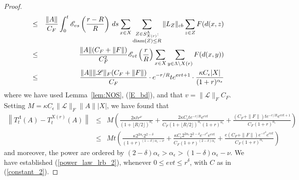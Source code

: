 \documentclass{article}
\newcommand{\E}{\mathscr{E}}
\newcommand{\<}{\langle}
\renewcommand{\>}{\rangle}
\numberwithin{equation}{section}
\theoremstyle{definition}
\begin{document}
\begin{proof}
\begin{eqnarray}
& \leq &
\frac{\|A \|}{C_F} \int_0^t \E_{vs} \left( \frac{r-R}{R} \right) \, ds \sum_{x \in X} \sum_{\substack{Z \in S^{\Lambda}_{X(r)}: \\ {\rm diam}(Z) \leq R}} \| L_Z \|_{cb}  \sum_{z \in Z} F(d(x,z)  
\nonumber \\
& \leq &
\frac{\|A \| (C_F + \| F \|)  }{C_F^2} \E_{vt} \left( \frac{r}{R} \right)  \sum_{x \in X} \sum_{y \in \Lambda \setminus X(r)} F(d(x,y))  \nonumber \\
& \leq & \frac{\|A \| \| \mathscr{L} \|_F(C_F + \| F \|)  }{C_F} \cdot e^{- r/R} t e^{evt+1} \cdot \frac{\kappa C_{\epsilon} |X|}{(1+r)^{\alpha_{\epsilon}}}
\end{eqnarray}
where we have used Lemma~\ref{lem:NOS}, (\ref{E_bd}), and that $v= \| \mathscr{L} \|_F C_F$. Setting $M = \kappa C_{\epsilon} \| \mathscr{L} \|_F \| A \| |X|$, we have found that 
\begin{eqnarray}
 \left\|T^{\Lambda}_t(A)-T^{X(r)}_t(A) \right\| & \leq & M \left( \frac{2 \kappa t r^{\nu}}{(1+ \lfloor R/2 \rfloor)^{\alpha_{\epsilon}}} + 
 \frac{2 \kappa C_{\epsilon} t e^{-r/R} e^{evt}}{C_F(1+ \lfloor R/2 \rfloor)^{\alpha_{\epsilon}} (1+r)^{\alpha_{\epsilon}}}  + \frac{(C_F + \| F \|) t e^{-r/R} e^{evt+1}}{C_F(1+r)^{\alpha_{\epsilon}}} \right)  \nonumber \\
 & \leq & M t \left( \frac{ \kappa 2^{2 \alpha_{\epsilon}} 2^{2-\delta}}{(1+ r)^{(1- \delta) \alpha_{\epsilon} - \nu} } +  \frac{\kappa C_{\epsilon} 2^{2 \alpha_{\epsilon}} 2^{2-\delta} e^{-r^{\delta}} e^{evt}}{C_F(1+ r)^{(2- \delta)\alpha_{\epsilon}} }  + \frac{e(C_F + \| F \|) e^{-r^{\delta}} e^{evt}}{C_F(1+r)^{\alpha_{\epsilon}}} \right) 
\end{eqnarray}
and moreover, the power are ordered by $(2 - \delta) \alpha_{\epsilon} > \alpha_{\epsilon} > (1- \delta) \alpha_{\epsilon} - \nu$. 
We have established (\ref{power_law_lrb_2}), whenever $0 \leq evt \leq r^{\delta}$, with $C$ as in (\ref{constant_2}). 
\end{proof}

%



 
%
\end{document}
